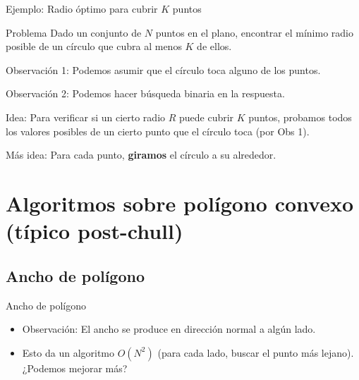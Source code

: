 \documentclass[compress]{beamer}
\begin{document}
\begin{frame}{Ejemplo: Radio óptimo para cubrir $K$ puntos}

\begin{block}{Problema}
    Dado un conjunto de $N$ puntos en el plano, encontrar el mínimo radio posible de un círculo que cubra al menos $K$ de ellos.
\end{block}

\pause
{}
{
    \begin{itemize}
        \item Observación 1: Podemos asumir que el círculo toca alguno de los puntos.
        \pause
        {
            \item Observación 2: Podemos hacer búsqueda binaria en la respuesta.
            \pause
            {
                \item Idea: Para verificar si un cierto radio $R$ puede cubrir $K$ puntos, probamos todos los valores posibles de un cierto punto que el círculo toca (por Obs 1).
                \item Más idea: Para cada punto, \textbf{giramos} el círculo a su alrededor.
            }
        }
    \end{itemize}
}

\end{frame}


\section{Algoritmos sobre polígono convexo (típico post-chull)}

\subsection{Ancho de polígono}

\begin{frame}{Ancho de polígono}
    \begin{itemize}
        \item Observación: El ancho se produce en dirección normal a algún lado.
        \item Esto da un algoritmo $O(N^2)$ (para cada lado, buscar el punto más lejano). ¿Podemos mejorar más?
        \pause
    \end{itemize}
\end{frame}
\end{document}

